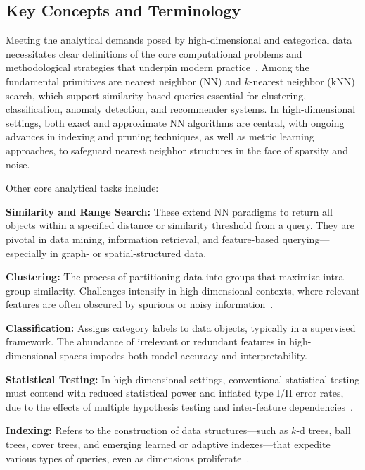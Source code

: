 \documentclass[sigconf]{acmart}
\begin{document}
\subsection{Key Concepts and Terminology}

Meeting the analytical demands posed by high-dimensional and categorical data necessitates clear definitions of the core computational problems and methodological strategies that underpin modern practice~\cite{ref1,ref2,ref5,ref6,ref11,ref12,ref30,ref32,ref36,ref37,ref38,ref39,ref42,ref43,ref46,ref52,ref71,ref72,ref73,ref76,ref90,ref93,ref96,ref110,ref116}. Among the fundamental primitives are nearest neighbor (NN) and $k$-nearest neighbor (kNN) search, which support similarity-based queries essential for clustering, classification, anomaly detection, and recommender systems. In high-dimensional settings, both exact and approximate NN algorithms are central, with ongoing advances in indexing and pruning techniques, as well as metric learning approaches, to safeguard nearest neighbor structures in the face of sparsity and noise.

Other core analytical tasks include:

\textbf{Similarity and Range Search:} These extend NN paradigms to return all objects within a specified distance or similarity threshold from a query. They are pivotal in data mining, information retrieval, and feature-based querying—especially in graph- or spatial-structured data.

\textbf{Clustering:} The process of partitioning data into groups that maximize intra-group similarity. Challenges intensify in high-dimensional contexts, where relevant features are often obscured by spurious or noisy information~\cite{ref11,ref39,ref46,ref96}.

\textbf{Classification:} Assigns category labels to data objects, typically in a supervised framework. The abundance of irrelevant or redundant features in high-dimensional spaces impedes both model accuracy and interpretability.

\textbf{Statistical Testing:} In high-dimensional settings, conventional statistical testing must contend with reduced statistical power and inflated type I/II error rates, due to the effects of multiple hypothesis testing and inter-feature dependencies~\cite{ref96}.

\textbf{Indexing:} Refers to the construction of data structures—such as $k$-d trees, ball trees, cover trees, and emerging learned or adaptive indexes—that expedite various types of queries, even as dimensions proliferate~\cite{ref36,ref52,ref71,ref110,ref116}.
\end{document}
